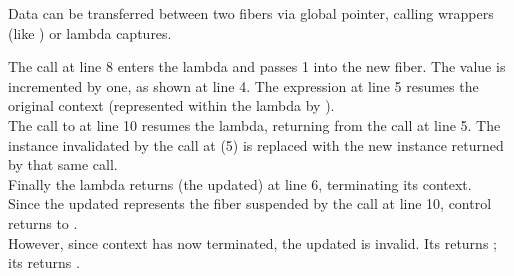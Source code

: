 
Data can be transferred between two fibers via global pointer, calling
wrappers (like ) or lambda captures.

The \resume call at line 8 enters the lambda and passes 1 into the
new fiber. The value is incremented by one, as shown at line 4. The expression
 at line 5 resumes the original context (represented
within the lambda by ).\\
The call to  at line 10 resumes the lambda, returning from
the  call at line 5. The \fiber instance 
invalidated by the \resume call at (5) is replaced with the new instance
returned by that same \resume call.\\
Finally the lambda returns (the updated)  at line 6, terminating its
context.\\

Since the updated  represents the fiber suspended by the call at
line 10, control returns to \main.\\

However, since context  has now terminated, the updated 
is invalid. Its \opbool returns ; its  returns
.\\

